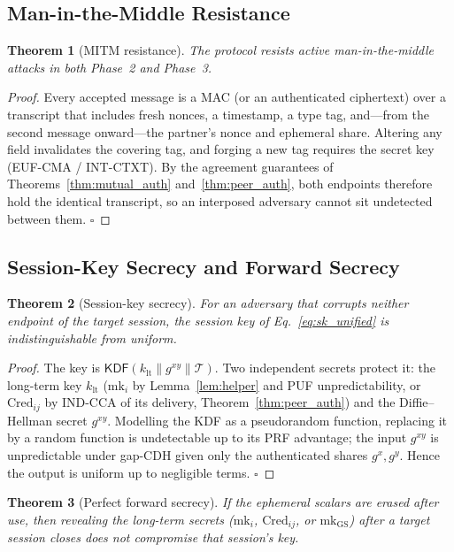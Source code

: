 \documentclass[11pt,a4paper]{article}
\newtheorem{theorem}{Theorem}
\begin{document}
\subsection{Man-in-the-Middle Resistance}

\begin{theorem}[MITM resistance]
\label{thm:mitm}
The protocol resists active man-in-the-middle attacks in both Phase~2 and
Phase~3.
\end{theorem}

\begin{proof}
Every accepted message is a MAC (or an authenticated ciphertext) over a
transcript that includes fresh nonces, a timestamp, a type tag, and---from the
second message onward---the partner's nonce and ephemeral share. Altering any
field invalidates the covering tag, and forging a new tag requires the secret
key (EUF-CMA / INT-CTXT). By the agreement guarantees of
Theorems~\ref{thm:mutual_auth} and~\ref{thm:peer_auth}, both endpoints therefore
hold the identical transcript, so an interposed adversary cannot sit undetected
between them. \hfill$\square$
\end{proof}

\subsection{Session-Key Secrecy and Forward Secrecy}

\begin{theorem}[Session-key secrecy]
\label{thm:key_secrecy}
For an adversary that corrupts neither endpoint of the target session, the
session key of Eq.~\eqref{eq:sk_unified} is indistinguishable from uniform.
\end{theorem}

\begin{proof}
The key is $\mathsf{KDF}(k_{\text{lt}}\|g^{xy}\|\mathcal{T})$. Two independent
secrets protect it: the long-term key $k_{\text{lt}}$
($\text{mk}_i$ by Lemma~\ref{lem:helper} and PUF unpredictability, or
$\text{Cred}_{ij}$ by IND-CCA of its delivery, Theorem~\ref{thm:peer_auth}) and
the Diffie--Hellman secret $g^{xy}$. Modelling the KDF as a pseudorandom
function, replacing it by a random function is undetectable up to its PRF
advantage; the input $g^{xy}$ is unpredictable under gap-CDH given only the
authenticated shares $g^{x},g^{y}$. Hence the output is uniform up to negligible
terms. \hfill$\square$
\end{proof}

\begin{theorem}[Perfect forward secrecy]
\label{thm:pfs}
If the ephemeral scalars are erased after use, then revealing the long-term
secrets ($\text{mk}_i$, $\text{Cred}_{ij}$, or $\text{mk}_{\text{GS}}$)
\emph{after} a target session closes does not compromise that session's key.
\end{theorem}
\end{document}
